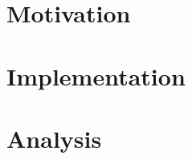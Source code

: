 \documentclass[ twoside,openright,titlepage,numbers=noenddot,headinclude,%
                a4paper,
                footinclude=true,cleardoublepage=empty,abstractoff, %
                BCOR=5mm,paper=a4,fontsize=11pt,%
                british,%
                ]{scrreprt}
\begin{document}
\frenchspacing
\raggedbottom
{} %
\renewcommand*{\bibname}{References}
\pagestyle{plain}

\small
%


%

%
%

\onehalfspacing

\singlespacing
%


\pagestyle{scrheadings}



\singlespacing
\normalsize

\cleardoublepage
\singlespacing
\setcounter{chapter}{-1}


\cleardoublepage {} \part{Motivation}
\cleardoublepage 

\cleardoublepage \part{Implementation}
\cleardoublepage 
\cleardoublepage 
\cleardoublepage 

\cleardoublepage \part{Analysis}
\cleardoublepage 
\cleardoublepage 

\cleardoublepage
\onehalfspacing


\appendix
\cleardoublepage
\end{document}
